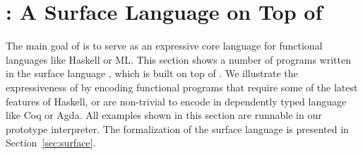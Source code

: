 \newcommand{\framedhslinecorrect}[2]%
  {#1[#2]}

\newcommand{\framedhs}{\sethscode{framedhscode}}


\newenvironment{inlinehscode}%
  {\(\def\column##1##2{}%
   \let\>\undefined\let\<\undefined\let\\\undefined
   \newcommand\>[1][]{}\newcommand\<[1][]{}\newcommand\\[1][]{}%
   \def\fromto##1##2##3{##3}%
   \def\nextline{}}{\) }%

\newcommand{\inlinehs}{\sethscode{inlinehscode}}


\newenvironment{joincode}%
  {\let\orighscode=\hscode
   \let\origendhscode=\endhscode
   \def\endhscode{\def\hscode{\endgroup\def\@currenvir{hscode}\\}\begingroup}
   \orighscode\def\hscode{\endgroup\def\@currenvir{hscode}}}%
  {\origendhscode
   \global\let\hscode=\orighscode
   \global\let\endhscode=\origendhscode}%

\makeatother
\EndFmtInput
%


\section{\sufcc: A Surface Language on Top of \name}
\label{sec:app}


The main goal of \name is to serve as an expressive core language
for functional languages like Haskell or ML.
This section shows a number of programs written in the surface
language \sufcc, which is built on top of \name. We illustrate the
expressiveness of \name by encoding functional programs that require
some of the latest features of Haskell, or are
non-trivial to encode in dependently typed language like Coq or
Agda. All examples shown in this section are runnable in our prototype
interpreter. The formalization of the surface language is presented in
Section~\ref{sec:surface}.

